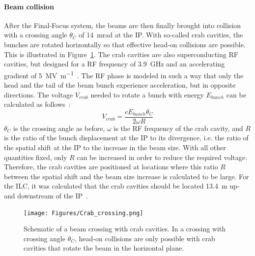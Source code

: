 \paragraph{Beam collision}
After the Final-Focus system, the beams are then finally brought into collision with a crossing angle $\theta_C$ of \SI{14}{\milli\radian} at the IP.\cite[p. 9-10]{TDR1}
With so-called crab cavities, the bunches are rotated horizontally so that effective head-on collisions are possible.
This is illustrated in Figure~\ref{fig:Crab_crossing}.
The crab cavities are also superconducting RF cavities, but designed for a RF frequency of \SI{3.9}{\giga\hertz} and an accelerating gradient of \SI{5}{\mega\volt\per\meter}~\cite[p. 154]{TDR32}.
The RF phase is modeled in such a way that only the head and the tail of the beam bunch experience acceleration, but in opposite directions.
The voltage $V_{crab}$ needed to rotate a bunch with energy $E_{bunch}$ can be calculated as follows~\cite{Crab_cavities}:
\begin{equation}
 V_{crab}=\frac{cE_{bunch}\theta_C}{2\omega R}
\end{equation}
$\theta_C$ is the crossing angle as before, $\omega$ is the RF frequency of the crab cavity, and $R$ is the ratio of the bunch displacement at the IP to its divergence, i.e. the ratio of the spatial shift at the IP to the increase in the beam size.
With all other quantities fixed, only $R$ can be increased in order to reduce the required voltage.
Therefore, the crab cavities are positioned at locations where this ratio $R$ between the spatial shift and the beam size increase is calculated to be large.
For the ILC, it was calculated that the crab cavities should be located \SI{13.4}{\meter} up- and downstream of the IP~\cite[p. 154]{TDR32}.
\begin{figure}
\centering
\texttt{[image: Figures/Crab\_crossing.png]}
\caption[Schematic of a beam crossing with crab cavities]{Schematic of a beam crossing with crab cavities. In a crossing with crossing angle $\theta_C$, head-on collisions are only possible with crab cavities that rotate the beam in the horizontal plane.}
\label{fig:Crab_crossing}
\end{figure}

